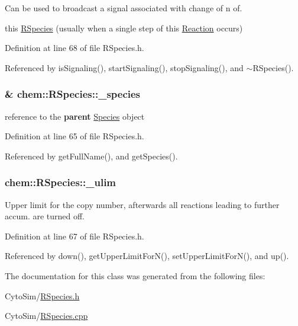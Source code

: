 Can be used to broadcast a signal associated with change of n of. 

this \hyperlink{classchem_1_1RSpecies}{R\-Species} (usually when a single step of this \hyperlink{classchem_1_1Reaction}{Reaction} occurs) 

Definition at line 68 of file R\-Species.\-h.



Referenced by is\-Signaling(), start\-Signaling(), stop\-Signaling(), and $\sim$\-R\-Species().

\hypertarget{classchem_1_1RSpecies_a3a979b9226800417c7aad81a2162fac5}{
\subsubsection[{\-\_\-species}]{\& {\bf chem\-::\-R\-Species\-::\-\_\-species}}}\label{classchem_1_1RSpecies_a3a979b9226800417c7aad81a2162fac5}


reference to the {\bfseries parent} \hyperlink{classchem_1_1Species}{Species} object 



Definition at line 65 of file R\-Species.\-h.



Referenced by get\-Full\-Name(), and get\-Species().

\hypertarget{classchem_1_1RSpecies_a189084cfe75e004f42a6a27b2c1c09ad}{
\subsubsection[{\-\_\-ulim}]{ {\bf chem\-::\-R\-Species\-::\-\_\-ulim}}}\label{classchem_1_1RSpecies_a189084cfe75e004f42a6a27b2c1c09ad}


Upper limit for the copy number, afterwards all reactions leading to further accum. are turned off. 



Definition at line 67 of file R\-Species.\-h.



Referenced by down(), get\-Upper\-Limit\-For\-N(), set\-Upper\-Limit\-For\-N(), and up().



The documentation for this class was generated from the following files\-:\begin{DoxyCompactItemize}
\item 
Cyto\-Sim/\hyperlink{RSpecies_8h}{R\-Species.\-h}\item 
Cyto\-Sim/\hyperlink{RSpecies_8cpp}{R\-Species.\-cpp}\end{DoxyCompactItemize}
